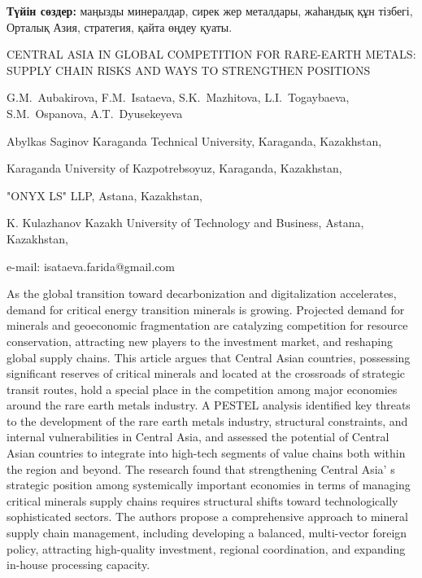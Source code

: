 {\bfseries Түйін сөздер:} маңызды минералдар, сирек жер металдары, жаһандық
құн тізбегі, Орталық Азия, стратегия, қайта өңдеу қуаты.

\begin{header}
CENTRAL ASIA IN GLOBAL COMPETITION FOR RARE-EARTH METALS: SUPPLY CHAIN RISKS AND WAYS TO STRENGTHEN POSITIONS

G.M.~Aubakirova,
F.M.~Isataeva\envelope,
S.K.~Mazhitova,
L.I.~Togaybaeva,
S.M.~Ospanova,
A.T.~Dyusekeyeva
\end{header}

\begin{affil}
Abylkas Saginov Karaganda Technical University, Karaganda, Kazakhstan,

Karaganda University of Kazpotrebsoyuz, Karaganda, Kazakhstan,

"ONYX LS" LLP, Astana, Kazakhstan,

K. Kulazhanov Kazakh University of Technology and Business, Astana, Kazakhstan,

e-mail: isataeva.farida@gmail.com
\end{affil}

As the global transition toward decarbonization and digitalization
accelerates, demand for critical energy transition minerals is growing.
Projected demand for minerals and geoeconomic fragmentation are
catalyzing competition for resource conservation, attracting new players
to the investment market, and reshaping global supply chains. This
article argues that Central Asian countries, possessing significant
reserves of critical minerals and located at the crossroads of strategic
transit routes, hold a special place in the competition among major
economies around the rare earth metals industry. A PESTEL analysis
identified key threats to the development of the rare earth metals
industry, structural constraints, and internal vulnerabilities in
Central Asia, and assessed the potential of Central Asian countries to
integrate into high-tech segments of value chains both within the region
and beyond. The research found that strengthening Central
Asia' s strategic position among systemically important
economies in terms of managing critical minerals supply chains requires
structural shifts toward technologically sophisticated sectors. The
authors propose a comprehensive approach to mineral supply chain
management, including developing a balanced, multi-vector foreign
policy, attracting high-quality investment, regional coordina\-tion, and
expanding in-house processing capacity.

